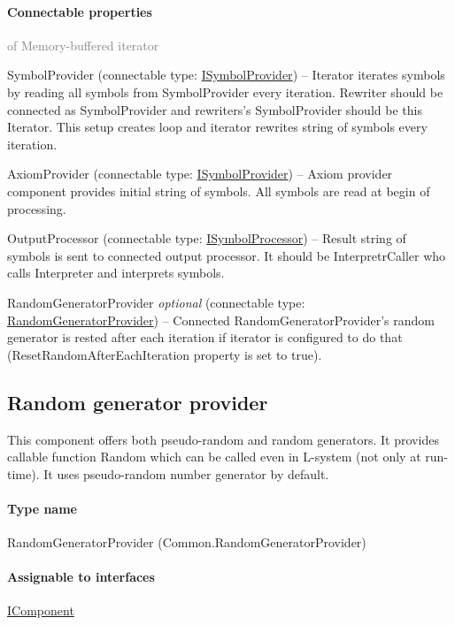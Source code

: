 	\paragraph{Connectable properties}\textcolor{gray}{of Memory-buffered iterator}
	\begin{description*}
		\item[SymbolProvider]
		(connectable type:  \hyperref[Malsys.Processing.Components.ISymbolProvider]{ISymbolProvider})
			-- Iterator iterates symbols by reading all symbols from SymbolProvider every iteration.
            Rewriter should be connected as SymbolProvider and rewriters's SymbolProvider should be this Iterator.
            This setup creates loop and iterator rewrites string of symbols every iteration.
		\item[AxiomProvider]
		(connectable type:  \hyperref[Malsys.Processing.Components.ISymbolProvider]{ISymbolProvider})
			-- Axiom provider component provides initial string of symbols.
            All symbols are read at begin of processing.
		\item[OutputProcessor]
		(connectable type:  \hyperref[Malsys.Processing.Components.ISymbolProcessor]{ISymbolProcessor})
			-- Result string of symbols is sent to connected output processor.
            It should be InterpretrCaller who calls Interpreter and interprets symbols.
		\item[RandomGeneratorProvider]
 \textit{optional} 		(connectable type:  \hyperref[Malsys.Processing.Components.Common.RandomGeneratorProvider]{RandomGeneratorProvider})
			-- Connected RandomGeneratorProvider's random generator is rested after each iteration
            if iterator is configured to do that (ResetRandomAfterEachIteration property is set to true).
	\end{description*}
	


\subsection{Random generator provider}
\label{Malsys.Processing.Components.Common.RandomGeneratorProvider}
This component offers both pseudo-random and random generators.
            It provides callable function Random which can be called even in
            L-system (not only at run-time).
            It uses pseudo-random number generator by default.\paragraph{Type name}
RandomGeneratorProvider (Common.RandomGeneratorProvider) 	\paragraph{Assignable to interfaces}
		\hyperref[Malsys.Processing.Components.IComponent]{IComponent}%
